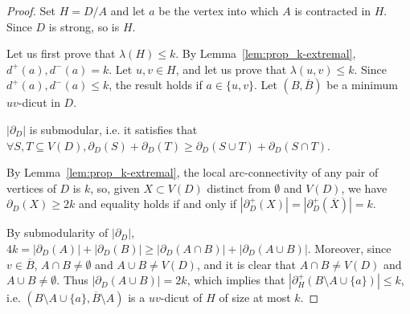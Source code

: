 \begin{proof}
    Set $H=D/A$ and let $a$ be the vertex into which $A$ is contracted in $H$.
    Since $D$ is strong, so is $H$.
    
    Let us first prove that $\lambda(H) \leq k$. 
     By Lemma~\ref{lem:prop_k-extremal}, $d^+(a), d^-(a) =  k$.  
    Let $u,v \in H$, and let us prove that $\lambda(u,v) \leq k$. Since $d^+(a), d^-(a) \leq  k$, the result holds if $a \in \{u,v\}$. 
    Let $(B, \overline{B})$ be a minimum $uv$-dicut in $D$. 
    
   
    $|\partial_D|$ is submodular, i.e. it satisfies that $\forall S, T \subseteq V(D), \partial_D(S) + \partial_D(T) \geq \partial_D(S \cup T) + \partial_D(S \cap T)$. 
    
    By Lemma~\ref{lem:prop_k-extremal}, the local arc-connectivity of any pair of vertices of $D$ is $k$, so, given $X \subset V(D)$  distinct from $\emptyset$ and $V(D)$, we have $\partial_D(X) \geq 2k$ and equality holds if and only if $|\partial_D^+(X)| = |\partial_D^+(\overline{X})| = k$. 
    
    By submodularity of $|\partial_D|$, $4k = |\partial_D(A)| + |\partial_D(B)| \geq |\partial_D(A \cap B)| + |\partial_D(A \cup B)|$. 
    Moreover, since $v \in \overline{B}$, $A \cap B \neq \emptyset$ and $A\cup B \neq V(D)$, and it is clear that $A \cap B \neq V(D)$ and $A \cup B \neq \emptyset$. 
    Thus $|\partial_D(A \cup B)| = 2k$, which implies that $|\partial_{H}^+(B \setminus A \cup \{a\})| \leq k$, i.e. $(B \setminus A \cup \{a\}, \overline B \setminus A)$ is a $uv$-dicut of $H$ of size at most $k$. 



\end{proof}
